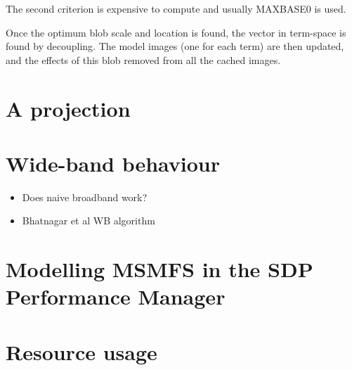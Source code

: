 \documentclass[11pt,a4paper]{article}
\begin{document}
The second criterion is expensive to compute and usually MAXBASE0 is used.

Once the optimum blob scale and location is found, the vector in term-space is found by decoupling. The model images (one for each term) are then updated, and the effects of this blob removed from all the cached images.

\clearpage
\section{A projection}
\label{sec:minor}

\clearpage
\section{Wide-band behaviour}
\label{sec:wideband}

\begin{itemize}
\item Does naive broadband work?
\item Bhatnagar et al WB algorithm	
\end{itemize}


\clearpage
\section{Modelling MSMFS in the SDP Performance Manager}
\label{sec:modelling}

\clearpage
\section{Resource usage}
\label{sec:resource}





\clearpage {}
%
\end{document}
